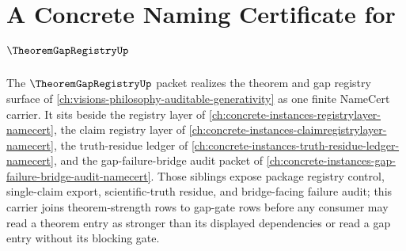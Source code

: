 \chapter{A Concrete Naming Certificate for $\TheoremGapRegistryUp$}
\label{ch:concrete-instances-theoremgapregistry-namecert}

The $\TheoremGapRegistryUp$ packet realizes the theorem and gap registry surface of \autoref{ch:visions-philosophy-auditable-generativity} as one finite NameCert carrier. It sits beside the registry layer of \autoref{ch:concrete-instances-registrylayer-namecert}, the claim registry layer of \autoref{ch:concrete-instances-claimregistrylayer-namecert}, the truth-residue ledger of \autoref{ch:concrete-instances-truth-residue-ledger-namecert}, and the gap-failure-bridge audit packet of \autoref{ch:concrete-instances-gap-failure-bridge-audit-namecert}. Those siblings expose package registry control, single-claim export, scientific-truth residue, and bridge-facing failure audit; this carrier joins theorem-strength rows to gap-gate rows before any consumer may read a theorem entry as stronger than its displayed dependencies or read a gap entry without its blocking gate.

